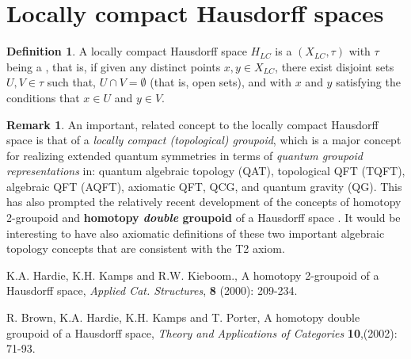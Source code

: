\documentclass[12pt]{article}
\theoremstyle{plain}
\theoremstyle{definition}
\newtheorem{definition}{Definition}[section]
\newtheorem{remark}{Remark}[section]
\numberwithin{equation}{section}
\begin{document}
\section{Locally compact Hausdorff spaces}

\begin{definition}  A locally compact Hausdorff space $H_{LC}$ is a 
 $(X_{LC}, \tau)$ with $\tau$ being a
, that is, if given any distinct points $x,y\in X_{LC}$, there exist disjoint 
sets $U,V\in\tau$ such that, $U\cap V=\emptyset$ (that is, open sets), and with $x$ and $y$ satisfying the conditions that $x \in U$ and $y \in V$.
\end{definition}

\begin{remark}
 An important, related concept to the locally compact Hausdorff space is that of a \emph{locally compact (topological)
groupoid}, which is a major concept for realizing extended quantum symmetries in
terms of \emph{quantum groupoid representations} in: quantum algebraic topology (QAT), topological QFT (TQFT), algebraic QFT (AQFT), axiomatic QFT, QCG, and quantum gravity (QG).  This has also prompted the relatively recent development of the concepts of homotopy 2-groupoid and \textbf{homotopy \emph{double} groupoid} of a 
Hausdorff space \cite{HKK, BHKP}. It would be interesting to have also axiomatic definitions of these two important algebraic topology concepts that are consistent with the T2 axiom. 
\end{remark}

\begin{thebibliography}{9}

K.A. Hardie, K.H. Kamps and R.W. Kieboom., A homotopy 2-groupoid of a Hausdorff space,
\emph{Applied Cat. Structures}, \textbf{8} (2000): 209-234.

R. Brown, K.A. Hardie, K.H. Kamps  and T. Porter, A homotopy double groupoid of a Hausdorff 
space, {\it Theory and Applications of Categories} \textbf{10},(2002): 71-93.

\end{thebibliography}
\end{document}
